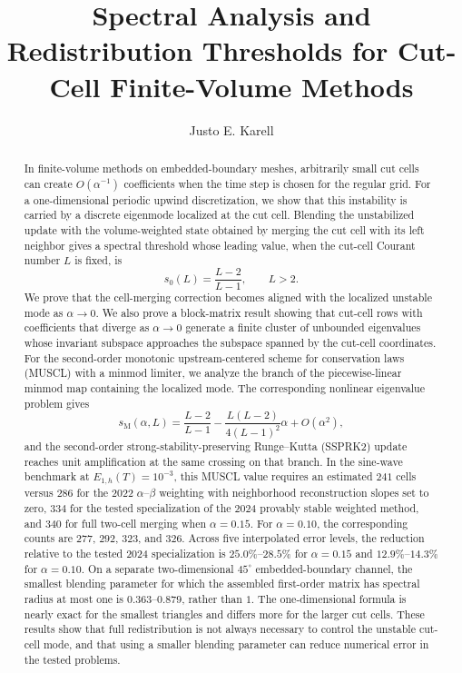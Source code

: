 \documentclass[preprint,12pt]{elsarticle}
\begin{document}
\begin{frontmatter}

\title{Spectral Analysis and Redistribution Thresholds for Cut-Cell Finite-Volume Methods}

\author[stevens]{Justo E. Karell}

\begin{abstract}
In finite-volume methods on embedded-boundary meshes, arbitrarily small cut
cells can create $O(\alpha^{-1})$ coefficients when the time step is chosen
for the regular grid.  For a one-dimensional periodic upwind discretization,
we show that this instability is carried by a discrete eigenmode localized at
the cut cell.  Blending the unstabilized update with the volume-weighted
state obtained by merging the cut cell with its left neighbor gives a spectral
threshold whose leading value, when the cut-cell Courant number $L$ is fixed,
is
\[
    s_0(L)=\frac{L-2}{L-1},\qquad L>2.
\]
We prove that the cell-merging correction becomes aligned with the localized
unstable mode as $\alpha\to0$.  We also prove a block-matrix result showing
that cut-cell rows with coefficients that diverge as $\alpha\to0$ generate a finite cluster of unbounded
eigenvalues whose invariant subspace approaches the subspace spanned by the
cut-cell coordinates.  For the second-order monotonic upstream-centered
scheme for conservation laws (MUSCL) with a minmod limiter, we analyze the branch of the piecewise-linear minmod map containing the
localized mode.  The corresponding
nonlinear eigenvalue problem gives
\[
    s_{\mathrm M}(\alpha,L)
    =
    \frac{L-2}{L-1}
    -
    \frac{L(L-2)}{4(L-1)^2}\alpha
    +O(\alpha^2),
\]
and the second-order strong-stability-preserving Runge--Kutta (SSPRK2) update
reaches unit amplification at the same crossing on that branch.  In the
sine-wave benchmark at $E_{1,h}(T)=10^{-3}$, this MUSCL value requires an
estimated $241$ cells versus $286$ for the 2022 $\alpha$--$\beta$ weighting
with neighborhood reconstruction slopes set to zero, $334$ for the tested
specialization of the 2024 provably stable weighted method, and $340$ for full
two-cell merging when $\alpha=0.15$.  For $\alpha=0.10$, the corresponding
counts are $277$, $292$, $323$, and $326$.  Across five interpolated error
levels, the reduction relative to the tested 2024 specialization is
$25.0\%$--$28.5\%$ for $\alpha=0.15$ and $12.9\%$--$14.3\%$ for
$\alpha=0.10$.  On a separate two-dimensional $45^\circ$ embedded-boundary
channel, the smallest blending parameter for which the assembled
first-order matrix has spectral radius at most one is $0.363$--$0.879$, rather
than $1$.  The one-dimensional formula is nearly exact for the smallest
triangles and differs more for the larger cut cells.  These results show that
full redistribution is not always necessary to control the unstable cut-cell
mode, and that using a smaller blending parameter can reduce numerical
error in the tested problems.
\end{abstract}


\end{frontmatter}
\end{document}

